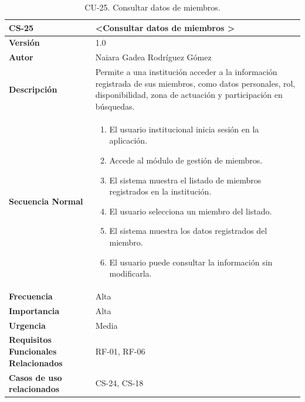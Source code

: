 \begin{table}[htbp] %
\centering
\begin{tabular}{ |m{3cm}|m{11cm}|  } 
\hline
\cellcolor[HTML]{B9E3F0}\centering\textbf{CS-25} & \cellcolor[HTML]{B9E3F0}\textbf{\textless Consultar datos de miembros \textgreater}\\

\hline
\cellcolor[HTML]{EFEFEF}\textbf{Versión}             & 1.0  \\
\hline
\cellcolor[HTML]{EFEFEF}\textbf{Autor}                & Naiara Gadea Rodríguez Gómez\\
\hline
\cellcolor[HTML]{EFEFEF}\textbf{Descripción}                & {Permite a una institución acceder a la información registrada de sus miembros, como datos personales, rol, disponibilidad, zona de actuación y participación en búsquedas.}\\
\hline
\cellcolor[HTML]{EFEFEF}\textbf{Secuencia \newline Normal}                &                 
        \begin{enumerate}
			\item El usuario institucional inicia sesión en la aplicación.
			\item Accede al módulo de gestión de miembros.
			\item El sistema muestra el listado de miembros registrados en la institución.
			\item El usuario selecciona un miembro del listado.
			\item El sistema muestra los datos registrados del miembro.
			\item El usuario puede consultar la información sin modificarla.
		\end{enumerate}\\
\hline
\cellcolor[HTML]{EFEFEF}\textbf{Frecuencia}                & Alta\\
\hline
\cellcolor[HTML]{EFEFEF}\textbf{Importancia}                & Alta\\
\hline
\cellcolor[HTML]{EFEFEF}\textbf{Urgencia}                & Media\\
\hline
\cellcolor[HTML]{EFEFEF}\textbf{Requisitos Funcionales Relacionados}                & {RF-01, RF-06}\\
\hline
\cellcolor[HTML]{EFEFEF}\textbf{Casos de uso relacionados}                & {CS-24, CS-18}\\
\hline
\end{tabular}
\caption{CU-25. Consultar datos de miembros.}
\end{table}

